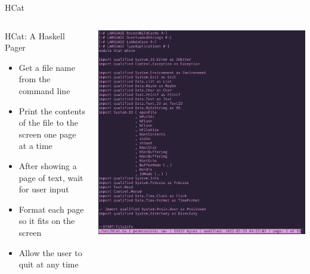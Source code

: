 \documentclass[10pt, presentation, colorlinks]{beamer}
\begin{document}
\begin{frame}[label={sec:org37075ab}]{HCat}
\begin{columns}
\begin{column}[t]{0.45\columnwidth}
\alert{HCat: A Haskell Pager}
\bigskip

\begin{itemize}
\item Get a file name from the command line
\item Print the contents of the file to the screen one page at a time
\item After showing a page of text, wait for user input
\item Format each page so it fits on the screen
\item Allow the user to quit at any time
\end{itemize}
\end{column}

\begin{column}[t]{0.45\columnwidth}
\begin{center}
\includegraphics[height=\textwidth]{./img/hcat-screen.png}
\end{center}
\end{column}
\end{columns}
\end{frame}
\end{document}

